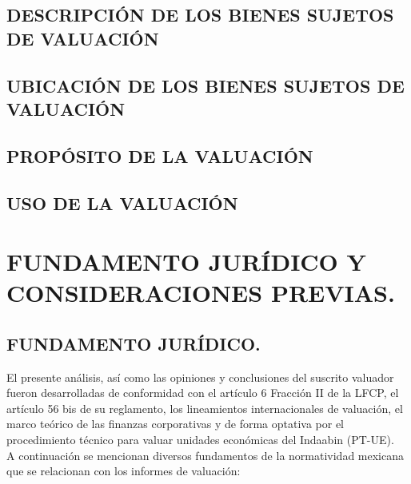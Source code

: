 \documentclass[10pt,letter]{report}
\begin{document}
\section{DESCRIPCI\'ON DE LOS BIENES SUJETOS DE VALUACI\'ON}\label{sec:f}


\section{UBICACI\'ON DE LOS BIENES SUJETOS DE VALUACI\'ON}\label{sec:g}


\section{PROP\'OSITO DE LA VALUACI\'ON}\label{sec:h}


\section{USO DE LA VALUACI\'ON}\label{sec:i}


\espacio{4cm}

\chapter{FUNDAMENTO JUR\'IDICO Y CONSIDERACIONES PREVIAS.}\label{cap:3}
\thispagestyle{fancy}
\setcounter{section}{9}

\section*{FUNDAMENTO JUR\'IDICO.}\label{sec:juridico}
El presente an\'alisis, as\'i como las opiniones y conclusiones del suscrito valuador fueron desarrolladas de conformidad con el art\'iculo 6 Fracci\'on II de la LFCP, el art\'iculo 56 bis de su reglamento, los lineamientos internacionales de valuaci\'on, el marco te\'orico de las finanzas corporativas y de forma optativa por el procedimiento t\'ecnico para valuar unidades econ\'omicas del Indaabin (PT-UE).\\

A continuaci\'on se mencionan diversos fundamentos de la normatividad mexicana que se relacionan con los informes de valuaci\'on:\\
\end{document}
